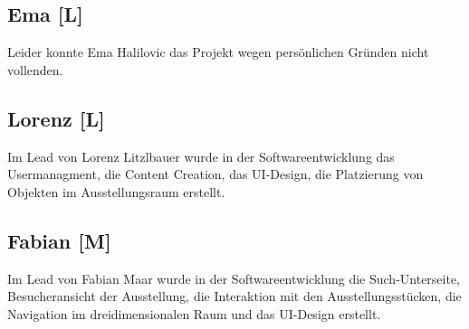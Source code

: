 \subsection{Ema [L]}
Leider konnte Ema Halilovic das Projekt wegen persönlichen Gründen nicht vollenden. 
\subsection{Lorenz [L]}
Im Lead von Lorenz Litzlbauer wurde in der Softwareentwicklung das 
Usermanagment, 
die Content Creation, 
das UI-Design, die Platzierung von Objekten im Ausstellungsraum erstellt.

\subsection{Fabian [M]}
Im Lead von Fabian Maar wurde in der Softwareentwicklung die Such-Unterseite, Besucheransicht der Ausstellung, die Interaktion mit den Ausstellungsstücken, die Navigation im dreidimensionalen Raum und das UI-Design erstellt.
	
